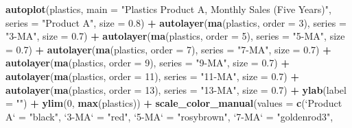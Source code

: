\documentclass[openany]{book}
\newenvironment{Shaded}{\begin{snugshade}}{\end{snugshade}}
\newcommand{\DataTypeTok}[1]{\textcolor[rgb]{0.13,0.29,0.53}{#1}}
\newcommand{\DecValTok}[1]{\textcolor[rgb]{0.00,0.00,0.81}{#1}}
\newcommand{\FloatTok}[1]{\textcolor[rgb]{0.00,0.00,0.81}{#1}}
\newcommand{\KeywordTok}[1]{\textcolor[rgb]{0.13,0.29,0.53}{\textbf{#1}}}
\newcommand{\NormalTok}[1]{#1}
\newcommand{\OperatorTok}[1]{\textcolor[rgb]{0.81,0.36,0.00}{\textbf{#1}}}
\newcommand{\StringTok}[1]{\textcolor[rgb]{0.31,0.60,0.02}{#1}}
\begin{document}
\begin{Shaded}
\begin{Highlighting}[]
\KeywordTok{autoplot}\NormalTok{(plastics, }\DataTypeTok{main =} \StringTok{"Plastics Product A, Monthly Sales (Five Years)"}\NormalTok{, }
  \DataTypeTok{series =} \StringTok{"Product A"}\NormalTok{, }\DataTypeTok{size =} \FloatTok{0.8}\NormalTok{) }\OperatorTok{+}\StringTok{ }\KeywordTok{autolayer}\NormalTok{(}\KeywordTok{ma}\NormalTok{(plastics, }
  \DataTypeTok{order =} \DecValTok{3}\NormalTok{), }\DataTypeTok{series =} \StringTok{"3-MA"}\NormalTok{, }\DataTypeTok{size =} \FloatTok{0.7}\NormalTok{) }\OperatorTok{+}\StringTok{ }\KeywordTok{autolayer}\NormalTok{(}\KeywordTok{ma}\NormalTok{(plastics, }
  \DataTypeTok{order =} \DecValTok{5}\NormalTok{), }\DataTypeTok{series =} \StringTok{"5-MA"}\NormalTok{, }\DataTypeTok{size =} \FloatTok{0.7}\NormalTok{) }\OperatorTok{+}\StringTok{ }\KeywordTok{autolayer}\NormalTok{(}\KeywordTok{ma}\NormalTok{(plastics, }
  \DataTypeTok{order =} \DecValTok{7}\NormalTok{), }\DataTypeTok{series =} \StringTok{"7-MA"}\NormalTok{, }\DataTypeTok{size =} \FloatTok{0.7}\NormalTok{) }\OperatorTok{+}\StringTok{ }\KeywordTok{autolayer}\NormalTok{(}\KeywordTok{ma}\NormalTok{(plastics, }
  \DataTypeTok{order =} \DecValTok{9}\NormalTok{), }\DataTypeTok{series =} \StringTok{"9-MA"}\NormalTok{, }\DataTypeTok{size =} \FloatTok{0.7}\NormalTok{) }\OperatorTok{+}\StringTok{ }\KeywordTok{autolayer}\NormalTok{(}\KeywordTok{ma}\NormalTok{(plastics, }
  \DataTypeTok{order =} \DecValTok{11}\NormalTok{), }\DataTypeTok{series =} \StringTok{"11-MA"}\NormalTok{, }\DataTypeTok{size =} \FloatTok{0.7}\NormalTok{) }\OperatorTok{+}\StringTok{ }\KeywordTok{autolayer}\NormalTok{(}\KeywordTok{ma}\NormalTok{(plastics, }
  \DataTypeTok{order =} \DecValTok{13}\NormalTok{), }\DataTypeTok{series =} \StringTok{"13-MA"}\NormalTok{, }\DataTypeTok{size =} \FloatTok{0.7}\NormalTok{) }\OperatorTok{+}\StringTok{ }\KeywordTok{ylab}\NormalTok{(}\DataTypeTok{label =} \StringTok{""}\NormalTok{) }\OperatorTok{+}\StringTok{ }
\StringTok{  }\KeywordTok{ylim}\NormalTok{(}\DecValTok{0}\NormalTok{, }\KeywordTok{max}\NormalTok{(plastics)) }\OperatorTok{+}\StringTok{ }\KeywordTok{scale_color_manual}\NormalTok{(}\DataTypeTok{values =} \KeywordTok{c}\NormalTok{(}\StringTok{`}\DataTypeTok{Product A}\StringTok{`}\NormalTok{ =}\StringTok{ "black"}\NormalTok{, }
  \StringTok{`}\DataTypeTok{3-MA}\StringTok{`}\NormalTok{ =}\StringTok{ "red"}\NormalTok{, }\StringTok{`}\DataTypeTok{5-MA}\StringTok{`}\NormalTok{ =}\StringTok{ "rosybrown"}\NormalTok{, }\StringTok{`}\DataTypeTok{7-MA}\StringTok{`}\NormalTok{ =}\StringTok{ "goldenrod3"}\NormalTok{, }

\end{Highlighting}
\end{Shaded}
\end{document}
